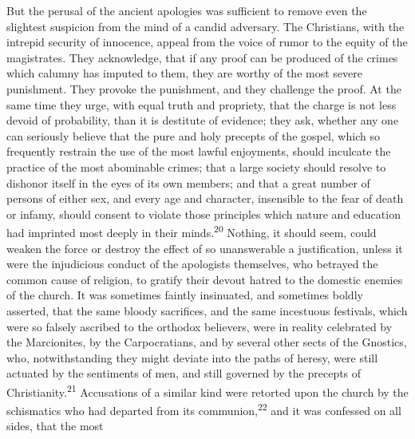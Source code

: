 

But the perusal of the ancient apologies was sufficient to remove
even the slightest suspicion from the mind of a candid adversary.
The Christians, with the intrepid security of innocence, appeal
from the voice of rumor to the equity of the magistrates. They
acknowledge, that if any proof can be produced of the crimes
which calumny has imputed to them, they are worthy of the most
severe punishment. They provoke the punishment, and they
challenge the proof. At the same time they urge, with equal truth
and propriety, that the charge is not less devoid of probability,
than it is destitute of evidence; they ask, whether any one can
seriously believe that the pure and holy precepts of the gospel,
which so frequently restrain the use of the most lawful
enjoyments, should inculcate the practice of the most abominable
crimes; that a large society should resolve to dishonor itself in
the eyes of its own members; and that a great number of persons
of either sex, and every age and character, insensible to the
fear of death or infamy, should consent to violate those
principles which nature and education had imprinted most deeply
in their minds.\textsuperscript{20} Nothing, it should seem, could weaken the
force or destroy the effect of so unanswerable a justification,
unless it were the injudicious conduct of the apologists
themselves, who betrayed the common cause of religion, to gratify
their devout hatred to the domestic enemies of the church. It was
sometimes faintly insinuated, and sometimes boldly asserted, that
the same bloody sacrifices, and the same incestuous festivals,
which were so falsely ascribed to the orthodox believers, were in
reality celebrated by the Marcionites, by the Carpocratians, and
by several other sects of the Gnostics, who, notwithstanding they
might deviate into the paths of heresy, were still actuated by
the sentiments of men, and still governed by the precepts of
Christianity.\textsuperscript{21} Accusations of a similar kind were retorted upon
the church by the schismatics who had departed from its
communion,\textsuperscript{22} and it was confessed on all sides, that the most
